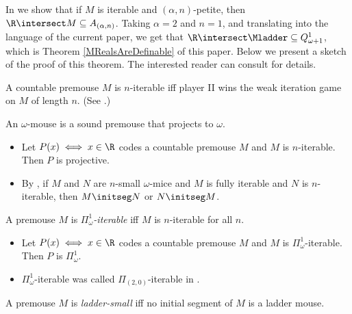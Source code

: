 \documentclass[oneside,12pt]{amsart}
\begin{document}
In \cite{Mouse_Sets} we show that if $M$ is iterable and $(\alpha,n)$-petite, then
$\R\intersect M \subseteq A_{(\alpha,n)}$. Taking $\alpha=2$ and $n=1$, and translating into the language of the current paper, we get that
$\R\intersect \Mladder \subseteq Q^1_{\omega+1}$, which is Theorem \ref{MRealsAreDefinable} of this paper.
Below we present a sketch of the proof of this theorem.
The interested reader can consult \cite{Mouse_Sets} for details.

\begin{definition}
A countable premouse $M$ is $n$-iterable iff
player II wins the weak iteration
game on $M$ of length $n$. (See \cite{Many_Woodins}.)
\end{definition}

\begin{definition}
An $\omega$-mouse is a sound premouse that projects to $\omega$.
\end{definition}


\begin{remarks}
\quad
\begin{itemize}
\item Let $P(x) \iff x\in\R $ codes a countable premouse $M$ and $M$ is $n$-iterable.
Then $P$ is projective.
\item By \cite{Proj_WO_In_Mod}, if $M$ and $N$ are $n$-small $\omega$-mice
and $M$ is fully iterable and $N$ is $n$-iterable, then $M\initseg N$ or $N\initseg M$.
\end{itemize}
\end{remarks}


\begin{definition}
\label{def-pi-one-omega-iterable}
A premouse $M$ is \emph{$\Pi^1_{\omega}$-iterable} iff $M$ is $n$-iterable for all $n$.
\end{definition}

\begin{remarks}
\quad
\begin{itemize}
\item  Let $P(x) \iff x\in\R $ codes a countable premouse $M$ and $M$ is $\Pi^1_{\omega}$-iterable.
Then $P$ is $\Pi^1_{\omega}$.
\item $\Pi^1_{\omega}$-iterable was called $\Pi_{(2,0)}$-iterable in \cite{Mouse_Sets}.
\end{itemize}
\end{remarks}

\begin{definition}
\label{def-ladder-small}
A premouse $M$ is \emph{ladder-small} iff no initial segment of $M$ is a ladder mouse.
\end{definition}
\end{document}
